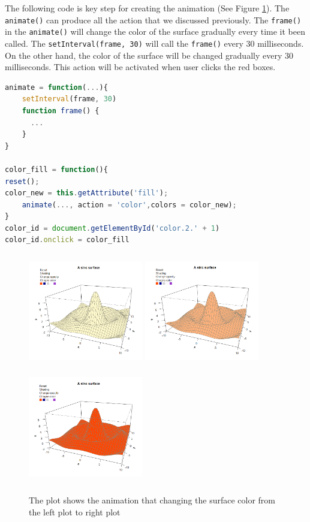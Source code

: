 \documentclass{report}
\begin{document}
The following code is key step for creating the animation (See Figure \ref{Example_6.3.1}). The \texttt{animate()} can produce all the action that we discussed previously. The \texttt{frame()} in the \texttt{animate()} will change the color of the surface gradually every time it been called. The \texttt{setInterval(frame, 30)} will call the \texttt{frame()} every 30 milliseconds. On the other hand, the color of the surface will be changed gradually every 30 milliseconds. This action will be activated when user clicks the red boxes.

\begin{lstlisting}[language = JavaScript]
animate = function(...){
    setInterval(frame, 30)
    function frame() {
      ...
    }
}

color_fill = function(){
reset();
color_new = this.getAttribute('fill');
    animate(..., action = 'color',colors = color_new);
}
color_id = document.getElementById('color.2.' + 1)
color_id.onclick = color_fill
\end{lstlisting}


\begin{figure}[h]
	\begin{center}
		\includegraphics[height = 5cm, width = 5cm]{figure/svg/origin_1.PNG}
		\includegraphics[height = 5cm, width = 5cm]{figure/svg/change_2.PNG}
		\includegraphics[height = 5cm, width = 5cm]{figure/svg/change_3.PNG}
		\caption{The plot shows the animation that changing the surface color from the left plot to right plot}
		\label{Example_6.3.1}
	\end{center}
\end{figure}
\end{document}
